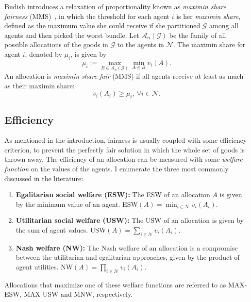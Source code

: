 Budish introduces a relaxation of proportionality known as \textit{maximin share fairness} (MMS)~\cite{Budish2011}, in which the threshold for each agent $i$ is her \textit{maximin share}, defined as the maximum value she could receive if she partitioned $\mathcal{G}$ among all agents and then picked the worst bundle. Let $\mathcal{A}_n(\mathcal{G})$ be the family of all possible allocations of the goods in $\mathcal{G}$ to the agents in $\mathcal{N}$. The maximin share for agent $i$, denoted by $\mu_i$, is given by
$$\mu_i := \max_{B\in \mathcal{A}_n(\mathcal{G})} \min_{A \in B} v_i(A).$$
An allocation is \textit{maximin share fair} (MMS) if all agents receive at least as much as their maximin share:
\begin{equation} \tag{MMS}
  v_i(A_i) \geq \mu_i,\ \forall i \in \mathcal{N}.
\end{equation}

\subsection{Efficiency}
As mentioned in the introduction, fairness is usually coupled with some efficiency criterion, to prevent the perfectly fair solution in which the whole set of goods is thrown away. The efficiency of an allocation can be measured with some \textit{welfare function} on the values of the agents. I enumerate the three most commonly discussed in the literature:
\begin{enumerate}
  \item \textbf{Egalitarian social welfare (ESW):} The ESW of an allocation $A$ is given by the minimum value of an agent. ESW$(A) = \min_{i\in \mathcal{N}}v_i(A_i)$.
  \item \textbf{Utilitarian social welfare (USW):} The USW of an allocation is given by the sum of agent values. USW$(A) = \sum_{i\in \mathcal{N}}v_i(A_i)$.
  \item \textbf{Nash welfare (NW):} The Nash welfare of an allocation is a compromise between the utilitarian and egalitarian approaches, given by the product of agent utilities. NW$(A) = \prod_{i\in \mathcal{N}}v_i(A_i)$.
\end{enumerate}
Allocations that maximize one of these welfare functions are referred to as MAX-ESW, MAX-USW and MNW, respectively. 

